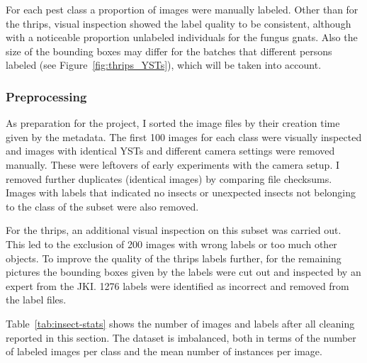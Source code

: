\documentclass[12pt,a4paper]{article}
\begin{document}
For each pest class a proportion of images were manually labeled. Other than for the thrips, visual inspection showed the label quality to be consistent, although with a noticeable proportion unlabeled individuals for the fungus gnats. Also the size of the bounding boxes may differ for the batches that different persons labeled (see Figure~\ref{fig:thrips_YSTs}), which will be taken into account. 

\subsubsection{Preprocessing}

As preparation for the project, I sorted the image files by their creation time given by the metadata. The first 100 images for each class were visually inspected and images with identical YSTs and different camera settings were removed manually. These were leftovers of early experiments with the camera setup. I removed further duplicates (identical images)  by comparing file checksums. Images with labels that indicated no insects or unexpected insects not belonging to the class of the subset were also removed. 

For the thrips, an additional visual inspection on this subset was carried out. This led to the exclusion of 200 images with wrong labels or too much other objects. To improve the quality of the thrips labels further, for the remaining pictures the bounding boxes given by the labels were cut out and inspected by an expert from the JKI. 1276 labels were identified as incorrect and removed from the label files.

Table~\ref{tab:insect-stats} shows the number of images and labels after all cleaning reported in this section. The dataset is imbalanced, both in terms of the number of labeled images per class and the mean number of instances per image.
\end{document}
